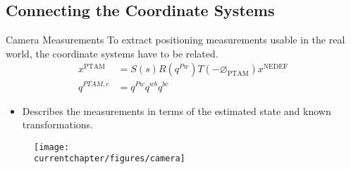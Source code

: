     \subsection{Connecting the Coordinate Systems}
    \begin{frame}{Camera Measurements}
        To extract positioning measurements usable in the real world,
        the coordinate systems have to be related.
        \begin{align*}
            x^{\text{PTAM}} &= S(s) R(q^{Pw}) T(-\varnothing_{\text{PTAM}}) x^{\text{NEDEF}} \\
            q^{PTAM,c} &= q^{Pw} q^{wb} q^{bc}
        \end{align*}
\vspace{-1cm}
        \begin{itemize}
            \item Describes the measurements in terms of the estimated state and known transformations.
        \end{itemize}
\vspace{-0.5cm}
        \begin{figure}[h]
        \centering
            \texttt{[image: \\currentchapter/figures/camera]}
        \end{figure}
    \end{frame}

